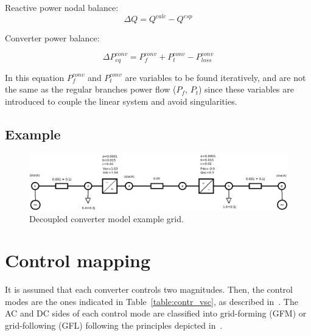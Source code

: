 \documentclass[11pt]{article}
\begin{document}
	
	Reactive power nodal balance:
	\begin{equation}
		\Delta Q = Q^{calc} - Q^{esp}
	\end{equation}
	
		
	Converter power balance:
	
	\begin{equation}
		\Delta P_{eq}^{conv} = P_f^{conv} + P_t^{conv} - P_{loss}^{conv}
	\end{equation}
	
	In this equation $P_f^{conv}$ and $P_t^{conv}$ are variables to be found iteratively, and are not the same as the regular branches power flow ($P_f$, $P_t$) since these variables are introduced to couple the linear system and avoid singularities.
	
	\subsection{Example}
	
	
	\begin{figure}[h!]
		\centering
		\includegraphics[width=1.0\linewidth]{acdc_6bus_diagram}
		\caption{Decoupled converter model example grid.}
		\label{fig:acdc6busdiagram}
	\end{figure}
	

	\newpage

	\section{Control mapping}
	It is assumed that each converter controls two magnitudes. Then, the control modes are the ones indicated in Table~\ref{table:contr_vsc}, as described in~\cite{alvarez2021universal}. The AC and DC sides of each control mode are classified into grid-forming (GFM) or grid-following (GFL) following the principles depicted in~\cite{gomis2020principles}.
\end{document}

